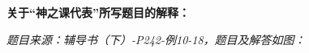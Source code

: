 % 
% 
% 
% 
% 
% 
% 
% 
% 
% 
% 
% 
% 
% 
% 
% 
% 
% 
% 
% 
% 
% 
% 
% 
% 
% 
% 
% 

\visibletrue

\ifvisible

	\newpage
	
	{\bf 关于“神之课代表”所写题目的解释：}
	
	{\it 题目来源：辅导书（下）-P242-例10-18，题目及解答如图：}
	
	\begin{center}
	\end{center}
	
